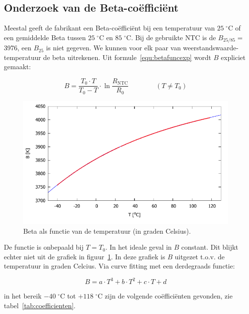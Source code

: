 \documentclass[12pt,a4paper,final,twoside,fleqn]{article}
\newcommand{\mathcelc}[1]{\mbox{$#1\;^\circ\text{C}$}}
\newcommand{\rntc}{R_\text{NTC}}
\newcommand{\betamantwofiveeightfive}{3976}
\begin{document}
\subsection{Onderzoek van de Beta-co\"effici\"ent}
Meestal geeft de fabrikant een Beta-co\"effici\"ent bij een temperatuur van
\mathcelc{25} of een gemiddelde Beta tussen \mathcelc{25} en \mathcelc{85}.
Bij de gebruikte NTC is de $B_{25/85} =$ \betamantwofiveeightfive, een $B_{25}$
is niet gegeven. We kunnen voor elk paar van weerstandswaarde-temperatuur de
beta uitrekenen. Uit formule~\eqref{equ:betafuncexp} wordt $B$ expliciet gemaakt:

\begin{equation}
\label{equ:betaexplicit}
B = \dfrac{T_0\cdot T}{T_0 - T}\cdot\ln\dfrac{\rntc}{R_0} \qquad\qquad(T \neq T_0)
\end{equation}

\begin{figure}[ht!]
\centering
\includegraphics[scale=1]{gnuplot/ntc_beta_celsius_fig}
\caption{Beta als functie van de temperatuur (in graden Celsius).}
\label{fig:betavstempcelsiusplot}
\end{figure}

De functie is onbepaald bij $T = T_0$. In het ideale geval in $B$ constant. Dit blijkt
echter niet uit de grafiek in figuur~\ref{fig:betavstempcelsiusplot}. In deze grafiek is
$B$ uitgezet t.o.v. de temperatuur in graden Celcius. Via curve fitting met een derdegraads
functie:

\begin{equation}
B = a\cdot T^3 + b\cdot T^2 + c\cdot T + d
\end{equation}

in het bereik \mathcelc{-40} tot \mathcelc{+118} zijn de volgende co\"effici\"enten
gevonden, zie tabel~\ref{tab:coefficienten}.
\end{document}
